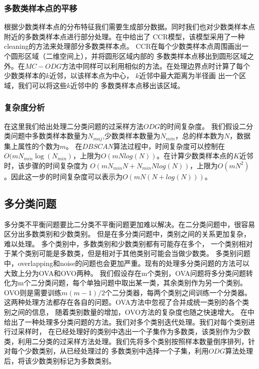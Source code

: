 \documentclass{article}
\begin{document}
\subsubsection{多数类样本点的平移}
根据少数类样本点的分布特征我们需要生成部分数据。同时我们也对少数类样本点附近的多数类样本点进行部分处理。在\cite{2017CCR}中给出了
CCR模型，该模型采用了一种cleaning的方法来处理部分多数类样本点。
CCR在每个少数类样本点周围画出一个圆形区域（二维空间上），并将圆形区域内部的
多数类样本点移出到圆形区域之外。在$MC-ODG$方法中同样可以利用相似的方法。在处理边界点时计算了每个少数类样本的$k$近邻，以该样本点为中心，
$k$近邻中最大距离为半径画
出一个区域，我们可以将这些$k$近邻中的
多数类样本点移出该区域。

\subsubsection{复杂度分析}
在这里我们给出处理二分类问题的过采样方法$ODG$的时间复杂度。
我们假设二分类问题中多数类样本数量为$N_{maj}$,少数类样本数量为$N_{min}$，总的样本数为$N$，数据集上属性的个数为$m$。
在$DBSCAN$算法过程中，时间复杂度可以控制在$O(mN_{min}\log(N_{min})$，上限为$O(mNlog(N))$。在计算少数类样本点的$K$近邻时，该步骤的时间复杂度为
$O(mN_{min}N+N_{min}Nlog(N))$，上限为$O(mN^2)$。因此这一步的时间复杂度可以表示为$O(mN(N+log(N)))$。


\subsection{多分类问题}
多分类不平衡问题要比二分类不平衡问题更加难以解决。在二分类问题中，很容易区分出多数类别和少数类别。
但是在多分类问题中，类别之间的关系更加复杂，难以处理。
多个类别中，多数类别和少数类别都有可能存在多个，
一个类别相对于某个类别可能是多数类，但是相对于其他类别可能会当做少数类。
多类别问题中，overlapping和noise的问题也会更加严重。现有的处理多分类问题的方法可以大致上分为OVA和OVO两种。
我们假设存在m个类别，OVA问题将多分类问题转化为m个二分类问题，每个单独问题中取出某一类，其余类别作为另一个类别。
OVO则是需要训练$m(m-1)/2$个二分类器，每两个类别之间训练一个分类器。这两种处理方法都存在各自的问题。OVA方法中忽视了合并成统一类别的各个类别之间的信息，
随着类别数量的增加，OVO方法的复杂度也随之快速增大。
在\cite{2017CCR,2019Radial}中给出了一种处理多分类问题的方法。我们对多个类别迭代处理。我们对每个类别进行过采样时，
在已经处理好的类别中选出一个子集作为多数类，该类别作为少数类，利用二分类的过采样方法处理。我们先将多个类别按照样本数量倒序排列，针对每个少数类别，从已经处理过的
多数类别中选择一个子集，利用$ODG$算法处理后，将该少数类别标记为多数类别。
\end{document}
